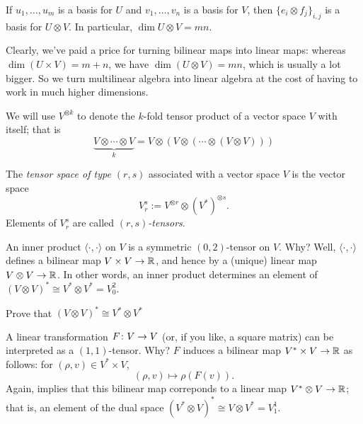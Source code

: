 \begin{proposition}\label{prop:tensor basis}
	If $u_1, \dots , u_m$ is a basis for $U$ and $v_1, \dots , v_n$ is a basis for $V$, then $\{e_i \otimes f_j\}_{i,j}$ is a basis for $U \otimes V$. In particular, $\dim U \otimes V = mn$.
\end{proposition}

Clearly, we've paid a price for turning bilinear maps into linear maps: whereas $\dim(U \times V) = m+n$, we have $\dim(U \otimes V) = mn$, which is usually a lot bigger. So we turn multilinear algebra into linear algebra at the cost of having to work in much higher dimensions.

\begin{notation}
	We will use $V^{\otimes k}$ to denote the $k$-fold tensor product of a vector space $V$ with itself; that is
	\[
		\underbrace{V \otimes \cdots \otimes V}_k = V \otimes (V \otimes( \cdots \otimes (V \otimes V)))
	\]
\end{notation}

\begin{definition}\label{def:tensor space}
	The \emph{tensor space of type $(r,s)$} associated with a vector space $V$ is the vector space
	\[
		V_r^s := V^{\otimes r} \otimes (V^\ast)^{\otimes s}.
	\]
	Elements of $V_r^s$ are called \emph{$(r,s)$-tensors}.
\end{definition}

\begin{example}
	An inner product $\langle \cdot , \cdot \rangle$ on $V$ is a symmetric $(0,2)$-tensor on $V$. Why? Well, $\langle \cdot , \cdot \rangle$ defines a bilinear map $V \times V \to \mathbb{R}$, and hence by  a (unique) linear map $V \otimes V \to \mathbb{R}$. In other words, an inner product determines an element of $(V \otimes V)^\ast \cong V^\ast \otimes V^\ast = V_0^2$.
	\begin{exercise}
		Prove that $(V \otimes V)^\ast \cong V^\ast \otimes V^\ast$
	\end{exercise}
\end{example}

\begin{example}
	A linear transformation $F\colon\thinspace\! V \to V$ (or, if you like, a square matrix) can be interpreted as a $(1,1)$-tensor. Why? $F$ induces a bilinear map $V^\ast \times V \to \mathbb{R}$ as follows: for $(\rho,v) \in V^\ast \times V$,
	\[
		(\rho, v ) \mapsto \rho(F(v)).
	\]
	Again,  implies that this bilinear map correponds to a linear map $V^\ast \otimes V \to \mathbb{R}$; that is, an element of the dual space $(V^\ast \otimes V)^\ast \cong V \otimes V^\ast = V_1^1$.
\end{example}

